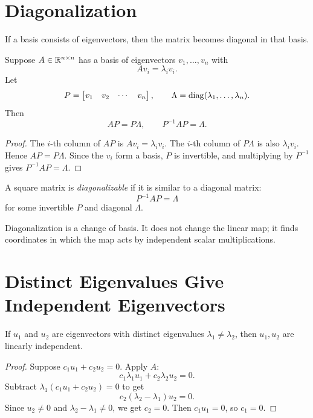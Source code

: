 \section{Diagonalization}

If a basis consists of eigenvectors, then the matrix becomes diagonal in that
basis.

\begin{theorem}
Suppose $A\in\mathbb{R}^{n\times n}$ has a basis of eigenvectors
$v_1,\ldots,v_n$ with
\[
  Av_i=\lambda_i v_i.
\]
Let
\[
  P=\begin{bmatrix}v_1&v_2&\cdots&v_n\end{bmatrix},
  \qquad
  \Lambda=\operatorname{diag}(\lambda_1,\ldots,\lambda_n).
\]
Then
\[
  AP=P\Lambda,
  \qquad
  P^{-1}AP=\Lambda.
\]
\end{theorem}

\begin{proof}
The $i$-th column of $AP$ is $Av_i=\lambda_i v_i$. The $i$-th column of
$P\Lambda$ is also $\lambda_i v_i$. Hence $AP=P\Lambda$. Since the $v_i$ form
a basis, $P$ is invertible, and multiplying by $P^{-1}$ gives
$P^{-1}AP=\Lambda$.
\end{proof}

\begin{definition}[Diagonalizable]
A square matrix is \emph{diagonalizable} if it is similar to a diagonal matrix:
\[
  P^{-1}AP=\Lambda
\]
for some invertible $P$ and diagonal $\Lambda$.
\end{definition}

Diagonalization is a change of basis. It does not change the linear map; it
finds coordinates in which the map acts by independent scalar multiplications.

\section{Distinct Eigenvalues Give Independent Eigenvectors}

\begin{proposition}
If $u_1$ and $u_2$ are eigenvectors with distinct eigenvalues
$\lambda_1\neq\lambda_2$, then $u_1,u_2$ are linearly independent.
\end{proposition}

\begin{proof}
Suppose $c_1u_1+c_2u_2=0$. Apply $A$:
\[
  c_1\lambda_1u_1+c_2\lambda_2u_2=0.
\]
Subtract $\lambda_1(c_1u_1+c_2u_2)=0$ to get
\[
  c_2(\lambda_2-\lambda_1)u_2=0.
\]
Since $u_2\neq 0$ and $\lambda_2-\lambda_1\neq 0$, we get $c_2=0$. Then
$c_1u_1=0$, so $c_1=0$.
\end{proof}

